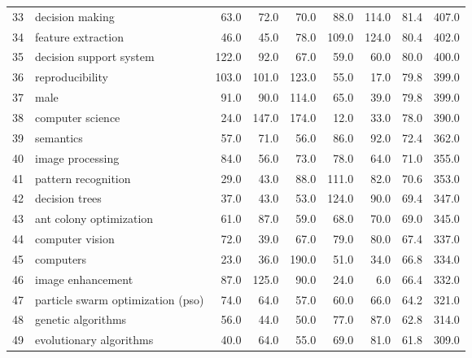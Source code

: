 \begin{tabular}{llrrrrrrr}
33 &                          decision making &    63.0 &    72.0 &    70.0 &    88.0 &   114.0 &    81.4 &   407.0 \\
34 &                       feature extraction &    46.0 &    45.0 &    78.0 &   109.0 &   124.0 &    80.4 &   402.0 \\
35 &                  decision support system &   122.0 &    92.0 &    67.0 &    59.0 &    60.0 &    80.0 &   400.0 \\
36 &                          reproducibility &   103.0 &   101.0 &   123.0 &    55.0 &    17.0 &    79.8 &   399.0 \\
37 &                                     male &    91.0 &    90.0 &   114.0 &    65.0 &    39.0 &    79.8 &   399.0 \\
38 &                         computer science &    24.0 &   147.0 &   174.0 &    12.0 &    33.0 &    78.0 &   390.0 \\
39 &                                semantics &    57.0 &    71.0 &    56.0 &    86.0 &    92.0 &    72.4 &   362.0 \\
40 &                         image processing &    84.0 &    56.0 &    73.0 &    78.0 &    64.0 &    71.0 &   355.0 \\
41 &                      pattern recognition &    29.0 &    43.0 &    88.0 &   111.0 &    82.0 &    70.6 &   353.0 \\
42 &                           decision trees &    37.0 &    43.0 &    53.0 &   124.0 &    90.0 &    69.4 &   347.0 \\
43 &                  ant colony optimization &    61.0 &    87.0 &    59.0 &    68.0 &    70.0 &    69.0 &   345.0 \\
44 &                          computer vision &    72.0 &    39.0 &    67.0 &    79.0 &    80.0 &    67.4 &   337.0 \\
45 &                                computers &    23.0 &    36.0 &   190.0 &    51.0 &    34.0 &    66.8 &   334.0 \\
46 &                        image enhancement &    87.0 &   125.0 &    90.0 &    24.0 &     6.0 &    66.4 &   332.0 \\
47 &        particle swarm optimization (pso) &    74.0 &    64.0 &    57.0 &    60.0 &    66.0 &    64.2 &   321.0 \\
48 &                       genetic algorithms &    56.0 &    44.0 &    50.0 &    77.0 &    87.0 &    62.8 &   314.0 \\
49 &                  evolutionary algorithms &    40.0 &    64.0 &    55.0 &    69.0 &    81.0 &    61.8 &   309.0 \\

\end{tabular}

